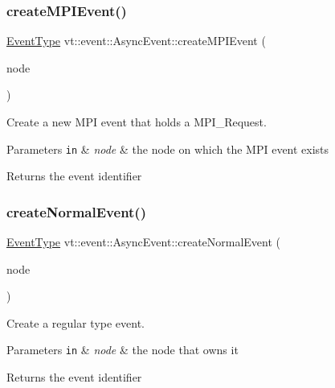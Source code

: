\subsubsection{\texorpdfstring{create\+M\+P\+I\+Event()}{createMPIEvent()}}
{\footnotesize\ttfamily \hyperlink{namespacevt_a009267401def7ae8bf201892222d060f}{Event\+Type} vt\+::event\+::\+Async\+Event\+::create\+M\+P\+I\+Event (\begin{DoxyParamCaption}\item[{\hyperlink{namespacevt_a866da9d0efc19c0a1ce79e9e492f47e2}{Node\+Type} const \&}]{node }\end{DoxyParamCaption})}



Create a new M\+PI event that holds a M\+P\+I\+\_\+\+Request. 


\begin{DoxyParams}[1]{Parameters}
\mbox{\tt in}  & {\em node} & the node on which the M\+PI event exists\\
\hline
\end{DoxyParams}
\begin{DoxyReturn}{Returns}
the event identifier 
\end{DoxyReturn}
\mbox{\label{structvt_1_1event_1_1_async_event_aa7c07c129ba54bde5abbe95c543ca352}} 
\subsubsection{\texorpdfstring{create\+Normal\+Event()}{createNormalEvent()}}
{\footnotesize\ttfamily \hyperlink{namespacevt_a009267401def7ae8bf201892222d060f}{Event\+Type} vt\+::event\+::\+Async\+Event\+::create\+Normal\+Event (\begin{DoxyParamCaption}\item[{\hyperlink{namespacevt_a866da9d0efc19c0a1ce79e9e492f47e2}{Node\+Type} const \&}]{node }\end{DoxyParamCaption})}



Create a regular type event. 


\begin{DoxyParams}[1]{Parameters}
\mbox{\tt in}  & {\em node} & the node that owns it\\
\hline
\end{DoxyParams}
\begin{DoxyReturn}{Returns}
the event identifier 
\end{DoxyReturn}
\mbox{\label{structvt_1_1event_1_1_async_event_a9646f211d660d2e991df07b77e5f2cc6}} 
